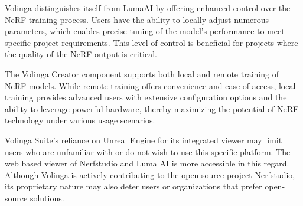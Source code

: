 Volinga distinguishes itself from LumaAI by offering enhanced control over the NeRF training process.
Users have the ability to locally adjust numerous parameters, which enables precise tuning of the model's performance to meet specific project requirements.
This level of control is beneficial for projects where the quality of the NeRF output is critical.

The Volinga Creator component supports both local and remote training of NeRF models.
While remote training offers convenience and ease of access, local training provides advanced users with extensive configuration options and the ability to leverage powerful hardware, thereby maximizing the potential of NeRF technology under various usage scenarios.

Volinga Suite's reliance on Unreal Engine for its integrated viewer may limit users who are unfamiliar with or do not wish to use this specific platform.
The web based viewer of Nerfstudio and Luma AI is more accessible in this regard.
Although Volinga is actively contributing to the open-source project Nerfstudio, its proprietary nature may also deter users or organizations that prefer open-source solutions.

